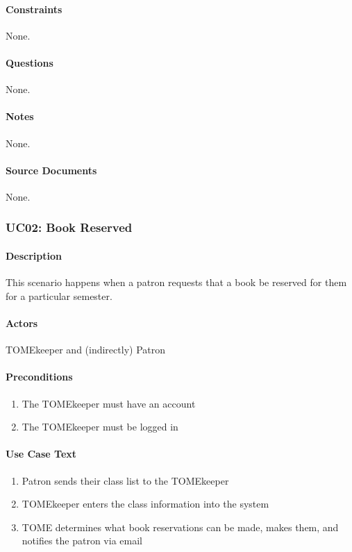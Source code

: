 \documentclass[12pt,titlepage]{article}
\begin{document}
\paragraph{Constraints}
None.
\paragraph{Questions}
None.
\paragraph{Notes}
None.
\paragraph{Source Documents}
None.


\subsubsection{UC02: Book Reserved}
\paragraph{Description}
This scenario happens when a patron requests that a book be reserved for them for a particular semester.
\paragraph{Actors}
TOMEkeeper and (indirectly) Patron
\paragraph{Preconditions}
\begin{enumerate}
	\item The TOMEkeeper must have an account
	\item The TOMEkeeper must be logged in
\end{enumerate}
\paragraph{Use Case Text}
\begin{enumerate}
	\item Patron sends their class list to the TOMEkeeper
	\item TOMEkeeper enters the class information into the system
	\item TOME determines what book reservations can be made, makes them, and notifies the patron via email
\end{enumerate}
\end{document}
